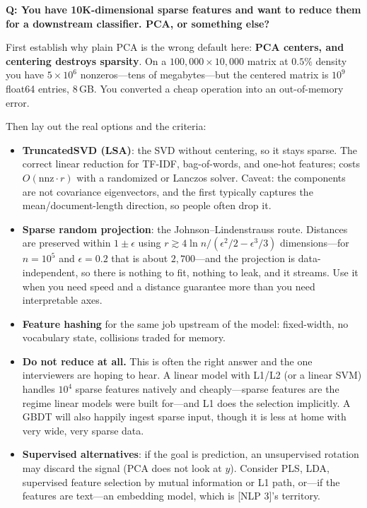 \begin{interviewq}
\textbf{Q: You have 10K-dimensional sparse features and want to reduce them for a downstream classifier. PCA, or something else?}

 \quad {} \quad \badgefreq{\freqmed}

\stronganswer

First establish why plain PCA is the wrong default here: \textbf{PCA centers, and centering destroys sparsity}. On a $100{,}000\times10{,}000$ matrix at $0.5\%$ density you have $5\times10^6$ nonzeros---tens of megabytes---but the centered matrix is $10^9$ float64 entries, $8$\,GB. You converted a cheap operation into an out-of-memory error.

Then lay out the real options and the criteria:
\begin{itemize}
    \item \textbf{TruncatedSVD (LSA)}: the SVD without centering, so it stays sparse. The correct linear reduction for TF-IDF, bag-of-words, and one-hot features; costs $O(\text{nnz}\cdot r)$ with a randomized or Lanczos solver. Caveat: the components are not covariance eigenvectors, and the first typically captures the mean/document-length direction, so people often drop it.
    \item \textbf{Sparse random projection}: the Johnson--Lindenstrauss route. Distances are preserved within $1\pm\epsilon$ using $r \gtrsim 4\ln n/(\epsilon^2/2 - \epsilon^3/3)$ dimensions---for $n=10^5$ and $\epsilon = 0.2$ that is about $2{,}700$---and the projection is data-independent, so there is nothing to fit, nothing to leak, and it streams. Use it when you need speed and a distance guarantee more than you need interpretable axes.
    \item \textbf{Feature hashing} for the same job upstream of the model: fixed-width, no vocabulary state, collisions traded for memory.
    \item \textbf{Do not reduce at all.} This is often the right answer and the one interviewers are hoping to hear. A linear model with L1/L2 (or a linear SVM) handles $10^4$ sparse features natively and cheaply---sparse features are the regime linear models were built for---and L1 does the selection implicitly. A GBDT will also happily ingest sparse input, though it is less at home with very wide, very sparse data.
    \item \textbf{Supervised alternatives}: if the goal is prediction, an unsupervised rotation may discard the signal (PCA does not look at $y$). Consider PLS, LDA, supervised feature selection by mutual information or L1 path, or---if the features are text---an embedding model, which is [NLP 3]'s territory.
\end{itemize}


\end{interviewq}
